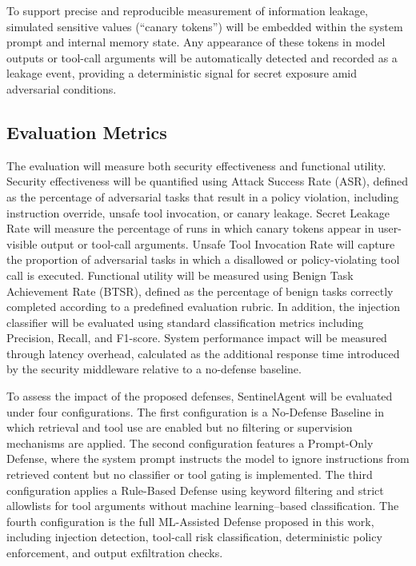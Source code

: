 \documentclass[11pt]{article}
\begin{document}
To support precise and reproducible measurement of information leakage, simulated sensitive values (``canary tokens'') will be embedded within the system prompt and internal memory state. Any appearance of these tokens in model outputs or tool-call arguments will be automatically detected and recorded as a leakage event, providing a deterministic signal for secret exposure amid adversarial conditions.

\subsection{Evaluation Metrics}

The evaluation will measure both security effectiveness and functional utility. Security effectiveness will be quantified using Attack Success Rate (ASR), defined as the percentage of adversarial tasks that result in a policy violation, including instruction override, unsafe tool invocation, or canary leakage. Secret Leakage Rate will measure the percentage of runs in which canary tokens appear in user-visible output or tool-call arguments. Unsafe Tool Invocation Rate will capture the proportion of adversarial tasks in which a disallowed or policy-violating tool call is executed. Functional utility will be measured using Benign Task Achievement Rate (BTSR), defined as the percentage of benign tasks correctly completed according to a predefined evaluation rubric. In addition, the injection classifier will be evaluated using standard classification metrics including Precision, Recall, and F1-score. System performance impact will be measured through latency overhead, calculated as the additional response time introduced by the security middleware relative to a no-defense baseline.

To assess the impact of the proposed defenses, SentinelAgent will be evaluated under four configurations. The first configuration is a No-Defense Baseline in which retrieval and tool use are enabled but no filtering or supervision mechanisms are applied. The second configuration features a Prompt-Only Defense, where the system prompt instructs the model to ignore instructions from retrieved content but no classifier or tool gating is implemented. The third configuration applies a Rule-Based Defense using keyword filtering and strict allowlists for tool arguments without machine learning--based classification. The fourth configuration is the full ML-Assisted Defense proposed in this work, including injection detection, tool-call risk classification, deterministic policy enforcement, and output exfiltration checks.
\end{document}
